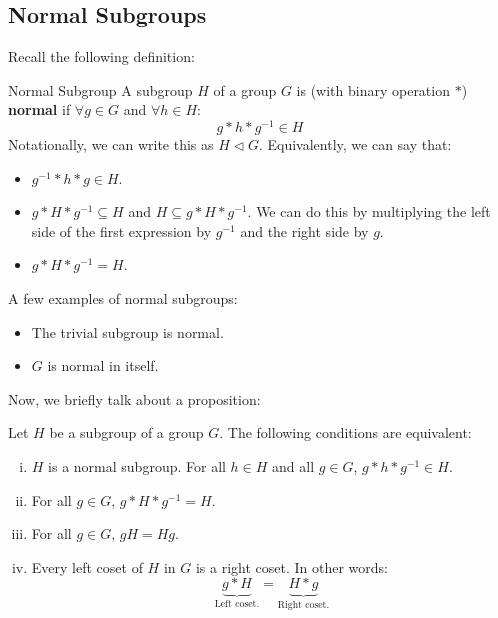 \documentclass[letterpaper]{article}
\begin{document}
\subsection{Normal Subgroups}
Recall the following definition:
\begin{definition}{Normal Subgroup}{}
    A subgroup $H$ of a group $G$ is (with binary operation $*$) \textbf{normal} if $\forall g \in G$ and $\forall h \in H$: 
    \[g * h * g^{-1} \in H\]
    Notationally, we can write this as $H \triangleleft G$. Equivalently, we can say that: 
    \begin{itemize}
        \item $g^{-1} * h * g \in H$.
        \item $g * H * g^{-1} \subseteq H$ and $H \subseteq g * H * g^{-1}$. We can do this by multiplying the left side of the first expression by $g^{-1}$ and the right side by $g$. 
        \item $g * H * g^{-1} = H$.
    \end{itemize}
\end{definition}

A few examples of normal subgroups: 
\begin{itemize}
    \item The trivial subgroup is normal. 
    \item $G$ is normal in itself. 
\end{itemize}

Now, we briefly talk about a proposition: 
\begin{mdframed}
    \begin{proposition}
        Let $H$ be a subgroup of a group $G$. The following conditions are equivalent: 
        \begin{enumerate}[(i)]
            \item $H$ is a normal subgroup. For all $h \in H$ and all $g \in G$, $g * h * g^{-1} \in H$. 
            \item For all $g \in G$, $g * H * g^{-1} = H$. 
            \item For all $g \in G$, $gH = Hg$. 
            \item Every left coset of $H$ in $G$ is a right coset. In other words:
            \[\underbrace{g * H}_{\text{Left coset.}} = \underbrace{H * g}_{\text{Right coset.}}\] 
        \end{enumerate}
    \end{proposition}
\end{mdframed}
\end{document}
